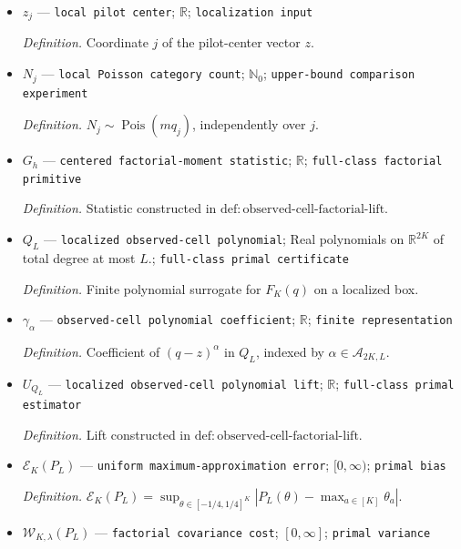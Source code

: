 \documentclass{article}
\begin{document}
\begin{itemize}
  \par\smallskip\noindent\emph{Definition.} Pilot center for the localized observed-cell mass vector \(q\).
  \item \(z_j\) --- \texttt{local pilot center}; \(\mathbb R\); \texttt{localization input}
  \par\smallskip\noindent\emph{Definition.} Coordinate \(j\) of the pilot-center vector \(z\).
  \item \(N_j\) --- \texttt{local Poisson category count}; \(\mathbb N_0\); \texttt{upper-\allowbreak{}bound comparison experiment}
  \par\smallskip\noindent\emph{Definition.} \(N_j\sim\operatorname{Pois}(m q_j)\), independently over \(j\).
  \item \(G_h\) --- \texttt{centered factorial-\allowbreak{}moment statistic}; \(\mathbb R\); \texttt{full-\allowbreak{}class factorial primitive}
  \par\smallskip\noindent\emph{Definition.} Statistic constructed in \(\mathrm{def{:}observed\text{-}cell\text{-}factorial\text{-}lift}\).
  \item \(Q_L\) --- \texttt{localized observed-\allowbreak{}cell polynomial}; Real polynomials on \(\mathbb R^{2K}\) of total degree at most \(L\).; \texttt{full-\allowbreak{}class primal certificate}
  \par\smallskip\noindent\emph{Definition.} Finite polynomial surrogate for \(F_K(q)\) on a localized box.
  \item \(\gamma_\alpha\) --- \texttt{observed-\allowbreak{}cell polynomial coefficient}; \(\mathbb R\); \texttt{finite representation}
  \par\smallskip\noindent\emph{Definition.} Coefficient of \((q-z)^\alpha\) in \(Q_L\), indexed by \(\alpha\in\mathcal A_{2K,L}\).
  \item \(U_{Q_L}\) --- \texttt{localized observed-\allowbreak{}cell polynomial lift}; \(\mathbb R\); \texttt{full-\allowbreak{}class primal estimator}
  \par\smallskip\noindent\emph{Definition.} Lift constructed in \(\mathrm{def{:}observed\text{-}cell\text{-}factorial\text{-}lift}\).
  \item \(\mathcal E_K(P_L)\) --- \texttt{uniform maximum-\allowbreak{}approximation error}; \([0,\infty)\); \texttt{primal bias}
  \par\smallskip\noindent\emph{Definition.} \(\mathcal E_K(P_L)=\sup_{\theta\in[-1/4,1/4]^K}|P_L(\theta)-\max_{a\in[K]}\theta_a|\).
  \item \(\mathcal W_{K,\lambda}(P_L)\) --- \texttt{factorial covariance cost}; \([0,\infty]\); \texttt{primal variance}

\end{itemize}
\end{document}
